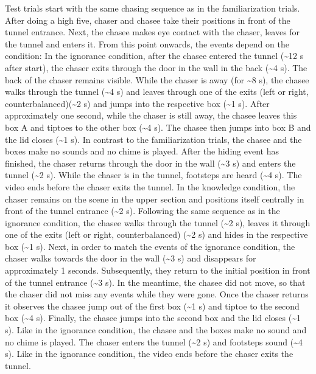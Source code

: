\documentclass[
  english,
  man, donotrepeattitle,floatsintext]{apa6}
\begin{document}
Test trials start with the same chasing sequence as in the familiarization trials. After doing a high five, chaser and chasee take their positions in front of the tunnel entrance. Next, the chasee makes eye contact with the chaser, leaves for the tunnel and enters it. From this point onwards, the events depend on the condition:
In the ignorance condition, after the chasee entered the tunnel (\textasciitilde12 s after start), the chaser exits through the door in the wall in the back (\textasciitilde4 s). The back of the chaser remains visible. While the chaser is away (for \textasciitilde8 s), the chasee walks through the tunnel (\textasciitilde4 s) and leaves through one of the exits (left or right, counterbalanced)(\textasciitilde2 s) and jumps into the respective box (\textasciitilde1 s). After approximately one second, while the chaser is still away, the chasee leaves this box A and tiptoes to the other box (\textasciitilde4 s). The chasee then jumps into box B and the lid closes (\textasciitilde1 s). In contrast to the familiarization trials, the chasee and the boxes make no sounds and no chime is played. After the hiding event has finished, the chaser returns through the door in the wall (\textasciitilde3 s) and enters the tunnel (\textasciitilde2 s). While the chaser is in the tunnel, footsteps are heard (\textasciitilde4 s). The video ends before the chaser exits the tunnel.
In the knowledge condition, the chaser remains on the scene in the upper section and positions itself centrally in front of the tunnel entrance (\textasciitilde2 s). Following the same sequence as in the ignorance condition, the chasee walks through the tunnel (\textasciitilde2 s), leaves it through one of the exits (left or right, counterbalanced) (\textasciitilde2 s) and hides in the respective box (\textasciitilde1 s). Next, in order to match the events of the ignorance condition, the chaser walks towards the door in the wall (\textasciitilde3 s) and disappears for approximately 1 seconds. Subsequently, they return to the initial position in front of the tunnel entrance (\textasciitilde3 s). In the meantime, the chasee did not move, so that the chaser did not miss any events while they were gone. Once the chaser returns it observes the chasee jump out of the first box (\textasciitilde1 s) and tiptoe to the second box (\textasciitilde4 s). Finally, the chasee jumps into the second box and the lid closes (\textasciitilde1 s). Like in the ignorance condition, the chasee and the boxes make no sound and no chime is played. The chaser enters the tunnel (\textasciitilde2 s) and footsteps sound (\textasciitilde4 s). Like in the ignorance condition, the video ends before the chaser exits the tunnel.
\end{document}
